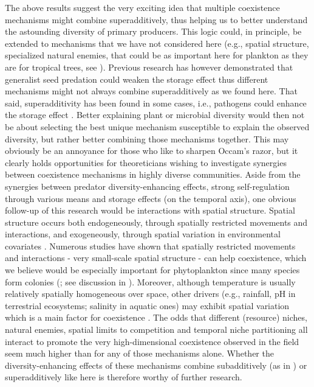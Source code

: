 \documentclass[smallcondensed,referee]{svjour3}       %
\begin{document}
The above results suggest the very exciting idea that multiple coexistence
mechanisms might combine superadditively, thus helping us to better
understand the astounding diversity of primary producers. This logic
could, in principle, be extended to mechanisms that we have not considered
here (e.g., spatial structure, specialized natural enemies, that could
be as important here for plankton as they are for tropical trees,
see \citealp{bagchi_pathogens_2014,comita_testing_2014,barraquand2018coastal}).
Previous research has however demonstrated that generalist seed predation
could weaken the storage effect \citep{kuang_coexistence_2009,kuang_interacting_2010}
thus different mechanisms might not always combine superadditively
as we found here. That said, superadditivity has been found in some
cases, i.e., pathogens could enhance the storage effect \citep{mordecai_pathogen_2015}.
Better explaining plant or microbial diversity would then not be about
selecting the best unique mechanism susceptible to explain the observed
diversity, but rather better combining those mechanisms together.
This may obviously be an annoyance for those who like to sharpen Occam's
razor, but it clearly holds opportunities for theoreticians wishing
to investigate synergies between coexistence mechanisms in highly
diverse communities. Aside from the synergies between predator diversity-enhancing
effects, strong self-regulation through various means and storage
effects (on the temporal axis), one obvious follow-up of this research
would be interactions with spatial structure. Spatial structure occurs
both endogeneously, through spatially restricted movements and interactions,
and exogeneously, through spatial variation in environmental covariates
\citep{bolker_combining_2003}. Numerous studies \citep[e.g.,][]{bolker_spatial_1999,murrell_2002}
have shown that spatially restricted movements and interactions -
very small-scale spatial structure - can help coexistence, which we
believe would be especially important for phytoplankton since many
species form colonies (\citealp{reynolds2006ecology}; see discussion
in \citealp{barraquand2018coastal}). Moreover, although temperature
is usually relatively spatially homogeneous over space, other drivers
(e.g., rainfall, pH in terrestrial ecosystems; salinity in aquatic
ones) may exhibit spatial variation which is a main factor for coexistence
\citep{snyder_when_2008}. The odds that different (resource) niches,
natural enemies, spatial limits to competition and temporal niche
partitioning all interact to promote the very high-dimensional coexistence
observed in the field seem much higher than for any of those mechanisms
alone. Whether the diversity-enhancing effects of these mechanisms
combine subadditively (as in \citealp{kuang_interacting_2010}) or
superadditively like here is therefore worthy of further research. 
\end{document}
